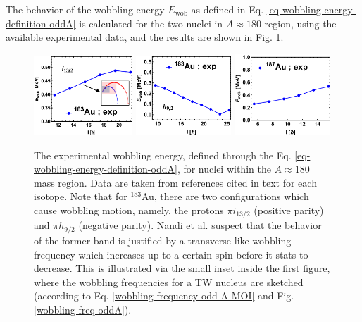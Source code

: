 The behavior of the wobbling energy $E_\text{wob}$ as defined in Eq. \ref{eq-wobbling-energy-definition-oddA} is calculated for the two nuclei in $A\approx 180$ region, using the available experimental data, and the results are shown in Fig. \ref{wobblers-exp-set4}.
\begin{figure}
    \centering
    \includegraphics[width=0.33\textwidth]{Chapters/Figures/wobblers/183Au_2-edited.pdf}
    \includegraphics[width=0.32\textwidth]{Chapters/Figures/wobblers/183Au_1.pdf}
    \includegraphics[width=0.32\textwidth]{Chapters/Figures/wobblers/187Au.pdf}
    \caption{The experimental wobbling energy, defined through the Eq. \ref{eq-wobbling-energy-definition-oddA}, for nuclei within the $A\approx 180$ mass region. Data are taken from references cited in text for each isotope. Note that for $^{183}$Au, there are two configurations which cause wobbling motion, namely, the protons $\pi i_{13/2}$ (positive parity) and $\pi h_{9/2}$ (negative parity). Nandi et al. \cite{nandi2020first} suspect that the behavior of the former band is justified by a transverse-like wobbling frequency which increases up to a certain spin before it stats to decrease. This is illustrated via the small inset inside the first figure, where the wobbling frequencies for a TW nucleus are sketched (according to Eq. \ref{wobbling-frequency-odd-A-MOI} and Fig. \ref{wobbling-freq-oddA}).}
    \label{wobblers-exp-set4}
\end{figure}


